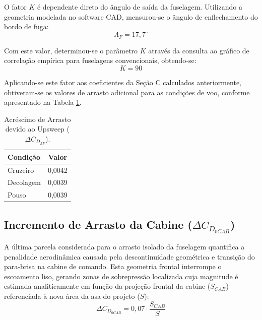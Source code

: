 O fator $K$ é dependente direto do ângulo de saída da fuselagem. Utilizando a geometria modelada no software CAD, mensurou-se o ângulo de enflechamento do bordo de fuga:
\begin{equation}
    \Lambda_F = 17,7^{\circ}
\end{equation}

Com este valor, determinou-se o parâmetro $K$ através da consulta ao gráfico de correlação empírica para fuselagens convencionais, obtendo-se:
\begin{equation}
    K = 90
\end{equation}

Aplicando-se este fator aos coeficientes da Seção C calculados anteriormente, obtiveram-se os valores de arrasto adicional para as condições de voo, conforme apresentado na Tabela \ref{tab:arrasto_upsweep}.

\begin{table}[H]
    \centering
    \caption{Acréscimo de Arrasto devido ao Upsweep ($\Delta C_{D_{\Lambda F}}$).}
    \vspace{0.2cm}
    \begin{tabular}{lc}
        \toprule
        \textbf{Condição} & \textbf{Valor} \\
        \midrule
        Cruzeiro & 0,0042 \\
        Decolagem & 0,0039 \\
        Pouso & 0,0039 \\
        \bottomrule
    \end{tabular}
    \label{tab:arrasto_upsweep}
\end{table}

\subsection{Incremento de Arrasto da Cabine ($\Delta C_{D_{0CAB}}$)}

A última parcela considerada para o arrasto isolado da fuselagem quantifica a penalidade aerodinâmica causada pela descontinuidade geométrica e transição do para-brisa na cabine de comando. Esta geometria frontal interrompe o escoamento liso, gerando zonas de sobrepressão localizada cuja magnitude é estimada analiticamente em função da projeção frontal da cabine ($S_{CAB}$) referenciada à nova área da asa do projeto ($S$):
\begin{equation}
    \Delta C_{D_{0CAB}} = 0,07 \cdot \frac{S_{CAB}}{S}
\end{equation}

